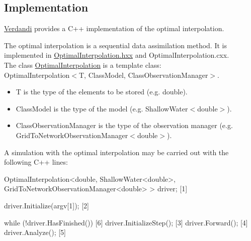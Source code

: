 \documentclass{tufte-book}
\begin{document}
 \hypertarget{optimal_interpolation_implementation}{}\subsection{\-Implementation}\label{optimal_interpolation_implementation}

 \hyperlink{namespace_verdandi}{\-Verdandi} provides a \-C++ implementation of the optimal interpolation.

\-The optimal interpolation is a sequential data assimilation method. \-It is implemented in {\ttfamily \hyperlink{_optimal_interpolation_8hxx_source}{\-Optimal\-Interpolation.\-hxx}} and {\ttfamily \-Optimal\-Interpolation.\-cxx}. \\
\-The class {\ttfamily  \hyperlink{class_verdandi_1_1_optimal_interpolation}{\-Optimal\-Interpolation}} is a template class\-:\\
 {\ttfamily \-Optimal\-Interpolation$<$\-T, Class\-Model, Class\-Observation\-Manager$>$}.
 \begin{itemize}
 \item {\ttfamily \-T} is the type of the elements to be stored (e.\-g. {\ttfamily double}).
 \item {\ttfamily \-Class\-Model} is the type of the model (e.\-g. {\ttfamily \-Shallow\-Water$<$double$>$}).
 \item {\ttfamily \-Class\-Observation\-Manager} is the type of the observation manager (e.\-g. {\ttfamily \-Grid\-To\-Network\-Observation\-Manager$<$double$>$}).
\end{itemize}
\-A simulation with the optimal interpolation may be carried out with the following \-C++ lines\-:

 \begin{frame_cpp}
OptimalInterpolation<double,  ShallowWater<double>,
         GridToNetworkObservationManager<double> > driver; [1]

driver.Initialize(argv[1]); [2]

while (!driver.HasFinished()) [6]
{
    driver.InitializeStep(); [3]
    driver.Forward(); [4]
    driver.Analyze(); [5]
}
\end{frame_cpp}
\end{document}
